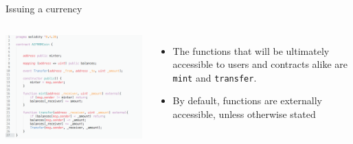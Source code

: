 \documentclass[11pt]{beamer}
\begin{document}
\begin{frame}{Issuing a currency}
	\begin{columns}
	    \includegraphics  [scale=0.3]{Images/contract_new}

	    \begin{itemize}
			\item The functions that will be ultimately accessible to users and contracts alike are \texttt{mint} and \texttt{transfer}.
			\item By default, functions are externally accessible, unless otherwise stated
	    \end{itemize}
	\end{columns}
\end{frame}

\end{document}
